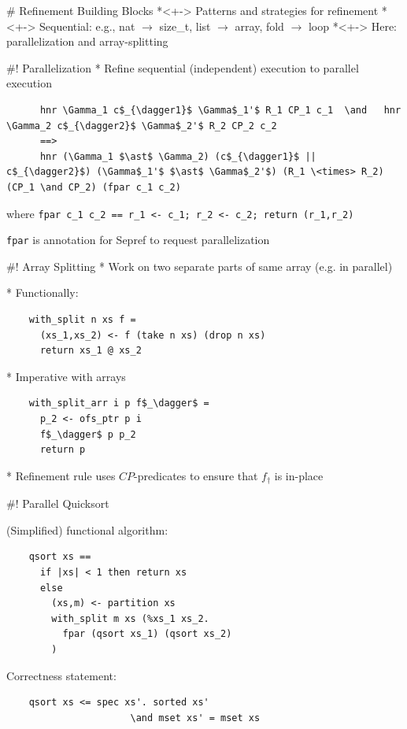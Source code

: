 \documentclass[fleqn]{beamer}
\begin{document}
# Refinement Building Blocks
  *<+-> Patterns and strategies for refinement
  *<+-> Sequential: e.g., nat $\to$ size\_t, list $\to$ array, fold $\to$ loop
  *<+-> Here: parallelization and array-splitting

#! Parallelization
  * Refine sequential (independent) execution to parallel execution
    \small
    \begin{lstlisting}
      hnr \Gamma_1 c$_{\dagger1}$ \Gamma$_1'$ R_1 CP_1 c_1  \and   hnr \Gamma_2 c$_{\dagger2}$ \Gamma$_2'$ R_2 CP_2 c_2
      ==>
      hnr (\Gamma_1 $\ast$ \Gamma_2) (c$_{\dagger1}$ || c$_{\dagger2}$) (\Gamma$_1'$ $\ast$ \Gamma$_2'$) (R_1 \<times> R_2) (CP_1 \and CP_2) (fpar c_1 c_2)
    \end{lstlisting}

  where
    \lstinline{fpar c_1 c_2 == r_1 <- c_1; r_2 <- c_2; return (r_1,r_2)}

    \lstinline{fpar} is annotation for Sepref to request parallelization

#! Array Splitting
  * Work on two separate parts of same array (e.g. in parallel)

  * Functionally:
  \begin{lstlisting}
    with_split n xs f =
      (xs_1,xs_2) <- f (take n xs) (drop n xs)
      return xs_1 @ xs_2
  \end{lstlisting}

  * Imperative with arrays
  \begin{lstlisting}
    with_split_arr i p f$_\dagger$ =
      p_2 <- ofs_ptr p i
      f$_\dagger$ p p_2
      return p
  \end{lstlisting}

  * Refinement rule uses $CP$-predicates to ensure that $f_\dagger$ is in-place

#! Parallel Quicksort
  \begin{minipage}[t]{.49\textwidth}
  (Simplified) functional algorithm:
  \begin{lstlisting}
    qsort xs ==
      if |xs| < 1 then return xs
      else
        (xs,m) <- partition xs
        with_split m xs (%xs_1 xs_2.
          fpar (qsort xs_1) (qsort xs_2)
        )
  \end{lstlisting}
  \end{minipage}
  \begin{minipage}[t]{.49\textwidth}
  Correctness statement:
  \begin{lstlisting}
    qsort xs <= spec xs'. sorted xs'
                      \and mset xs' = mset xs
  \end{lstlisting}
  \end{minipage}
\end{document}
